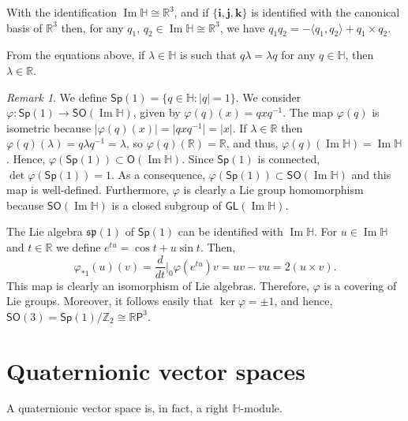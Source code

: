 \documentclass[12pt, a4paper]{amsart}
\newcommand{\g}{\mathfrak}
\newcommand{\R}{\mathbb{R}}
\renewcommand{\H}{\mathbb{H}}
\renewcommand{\Im}{\operatorname{Im}}
\newcommand{\Sp}{\mathsf{Sp}}
\theoremstyle{remark}
\newtheorem*{remark}{Remark}
\begin{document}
With the identification $\Im\H\cong\R^3$, and if $\{\mathbf{i},\mathbf{j},\mathbf{k}\}$ is identified with the canonical basis of $\R^3$ then, for any $q_1$, $q_2\in\Im{\H}\cong\R^3$, we have $q_1 q_2=-\langle q_1,q_2\rangle+q_1\times q_2$.

From the equations above, if $\lambda\in\H$ is such that $q\lambda=\lambda q$ for any $q\in\H$, then $\lambda\in\R$.

\begin{remark}
We define $\Sp(1)=\{q\in\H:\lvert q\rvert =1\}$.
We consider $\varphi\colon\Sp(1)\to\mathsf{SO}(\Im\H)$, given by $\varphi(q)(x)=qxq^{-1}$. 
The map $\varphi(q)$ is isometric because $\lvert\varphi(q)(x)\rvert=\lvert qxq^{-1}\rvert=\lvert x\rvert$. 
If $\lambda\in\R$ then $\varphi(q)(\lambda)=q\lambda q^{-1}=\lambda$, so $\varphi(q)(\R)=\R$, and thus, $\varphi(q)(\Im\H)=\Im\H$. 
Hence, $\varphi(\Sp(1))\subset\mathsf{O}(\Im\H)$.
Since $\Sp(1)$ is connected, $\det\varphi(\Sp(1))=1$. 
As a consequence, $\varphi(\Sp(1))\subset\mathsf{SO}(\Im\H)$ and this map is well-defined.
Furthermore, $\varphi$ is clearly a Lie group homomorphism because $\mathsf{SO}(\Im\H)$ is a closed subgroup of $\mathsf{GL}(\Im\H)$. 

The Lie algebra $\g{sp}(1)$ of $\Sp(1)$ can be identified with $\Im\H$.
For $u\in\Im\H$ and $t\in\R$ we define $e^{tu}=\cos t+u\sin t$.
Then, 
\[
\varphi_{*1}(u)(v)=\frac{d}{dt}\bigg\vert_0\varphi(e^{tu})v=uv-vu=2(u\times v).
\]
This map is clearly an isomorphism of Lie algebras. 
Therefore, $\varphi$ is a covering of Lie groups.
Moreover, it follows easily that $\ker\varphi={\pm 1}$, and hence, $\mathsf{SO}(3)=\Sp(1)/\mathbb{Z}_2\cong\R\mathsf{P}^3$.
\end{remark}

\section{Quaternionic vector spaces}

A quaternionic vector space is, in fact, a right $\H$-module.
\end{document}
